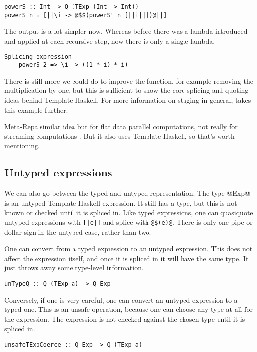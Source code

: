 \begin{lstlisting}
powerS :: Int -> Q (TExp (Int -> Int))
powerS n = [||\i -> @$$(powerS' n [||i||])@||]
\end{lstlisting}

The output is a lot simpler now.
Whereas before there was a lambda introduced and applied at each recursive step, now there is only a single lambda.

\begin{lstlisting}
Splicing expression
    powerS 2 => \i -> ((1 * i) * i)
\end{lstlisting}

There is still more we could do to improve the function, for example removing the multiplication by one, but this is sufficient to show the core splicing and quoting ideas behind Template Haskell.
For more information on staging in general, \citet{rompf2010lightweight} takes this example further.

Meta-Repa similar idea but for flat data parallel computations, not really for streaming computations \cite{ankner2013edsl}.
But it also uses Template Haskell, so that's worth mentioning.

\subsection{Untyped expressions}
We can also go between the typed and untyped representation.
The type @Exp@ is an untyped Template Haskell expression.
It still has a type, but this is not known or checked until it is spliced in.
Like typed expressions, one can quasiquote untyped expressions with \lstinline/[|e|]/ and splice with \lstinline/@$(e)@/.
There is only one pipe or dollar-sign in the untyped case, rather than two.

One can convert from a typed expression to an untyped expression.
This does not affect the expression itself, and once it is spliced in it will have the same type.
It just throws away some type-level information.

\begin{lstlisting}
unTypeQ :: Q (TExp a) -> Q Exp
\end{lstlisting}

Conversely, if one is very careful, one can convert an untyped expression to a typed one.
This is an unsafe operation, because one can choose any type at all for the expression.
The expression is not checked against the chosen type until it is spliced in.
\begin{lstlisting}
unsafeTExpCoerce :: Q Exp -> Q (TExp a)
\end{lstlisting}

